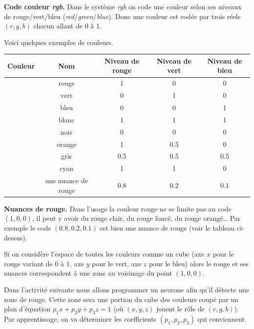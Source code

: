 \documentclass[10pt,class=report,crop=false]{standalone}
\begin{document}
\begin{cours}[Couleurs]
	
	
\textbf{Code couleur \emph{rgb}.}
Dans le système \emph{rgb} on code une couleur selon ses niveaux de rouge/vert/bleu (\emph{red}/\emph{green}/\emph{blue}). Donc une couleur est codée par trois réels $(r,g,b)$ 
chacun allant de $0$ à $1$.


Voici quelques exemples de couleurs.

\begin{center}
	\begin{tabular}{|c|c|c|c|c|}
		\hline
		Couleur & Nom & Niveau de rouge & Niveau de vert & Niveau de bleu \\ \hline
		\cellcolor{red}  & rouge  & 1 & 0 & 0 \\ \hline
		\cellcolor{green}& vert  & 0 & 1 & 0 \\ \hline
		\cellcolor{blue} & bleu   & 0 & 0 & 1 \\ \hline
		\cellcolor{white} & blanc  & 1 & 1 & 1  \\ \hline
		\cellcolor{black} & noir   & 0 & 0 & 0  \\ \hline
		\cellcolor{myorange} & orange & 1 & 0.5 & 0  \\ \hline  
		\cellcolor{mygray}& gris   & 0.5 & 0.5 & 0.5 \\ \hline
		\cellcolor{mycyan}& cyan   & 1 & 1 & 0 \\ \hline
		\cellcolor{myred}& une nuance de rouge   & 0.8 & 0.2 & 0.1 \\ \hline
	\end{tabular}
\end{center}

\medskip

\textbf{Nuances de rouge.}
Dans l'usage la couleur rouge ne se limite pas au code $(1,0,0)$, il peut y avoir du rouge clair, du rouge foncé, du rouge orangé\ldots{} Par exemple le code $(0.8,0.2,0.1)$ est bien une nuance de rouge (voir le tableau ci-dessus).

Si on considère l'espace de toutes les couleurs comme un cube (axe $x$ pour le rouge variant de $0$ à $1$, axe $y$ pour le vert, axe $z$ pour le bleu) alors le rouge et ses nuances correspondent à une zone au voisinage du point $(1,0,0)$.


Dans l'activité suivante nous allons programmer un neurone afin qu'il détecte une zone de rouge.
Cette zone sera une portion du cube des couleurs coupé par un plan d'équation $p_1 x+ p_2 y + p_3 z = 1$
(où $(x,y,z)$ jouent le rôle de $(r,g,b)$). Par apprentissage, on va déterminer les coefficients $(p_1,p_2,p_3)$ qui conviennent.



\end{cours}
\end{document}
